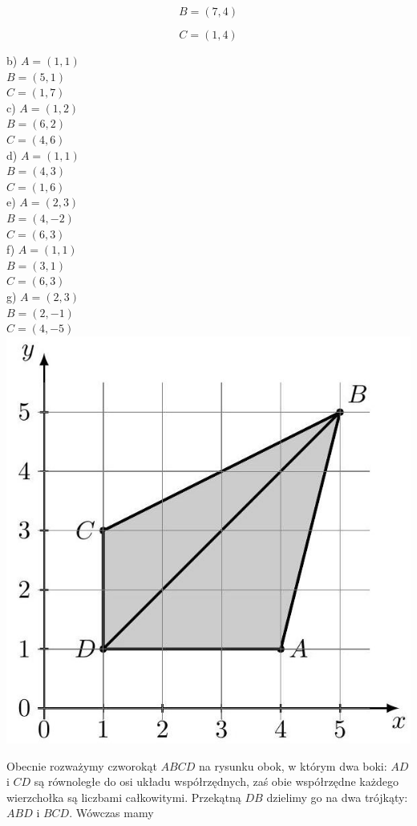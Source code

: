 \documentclass[10pt]{article}
\begin{document}
\[
B=(7,4)
\]

\[
C=(1,4)
\]

b) \(A=(1,1)\)\\
\(B=(5,1)\)\\
\(C=(1,7)\)\\
c) \(A=(1,2)\)\\
\(B=(6,2)\)\\
\(C=(4,6)\)\\
d) \(A=(1,1)\)\\
\(B=(4,3)\)\\
\(C=(1,6)\)\\
e) \(A=(2,3)\)\\
\(B=(4,-2)\)\\
\(C=(6,3)\)\\
f) \(A=(1,1)\)\\
\(B=(3,1)\)\\
\(C=(6,3)\)\\
g) \(A=(2,3)\)\\
\(B=(2,-1)\)\\
\(C=(4,-5)\)\\
\includegraphics[max width=\textwidth, center]{2024_11_21_8f01584889ff06348ae7g-202(1)}

Obecnie rozważymy czworokąt \(A B C D\) na rysunku obok, w którym dwa boki: \(A D\) i \(C D\) są równoległe do osi układu współrzędnych, zaś obie współrzędne każdego wierzchołka są liczbami całkowitymi. Przekątną \(D B\) dzielimy go na dwa trójkąty: \(A B D\) i \(B C D\). Wówczas mamy
\end{document}

